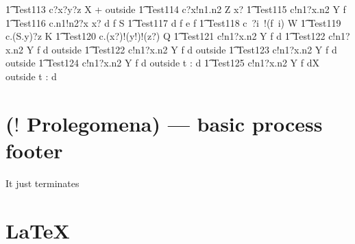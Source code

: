 \documentclass{article}
\begin{document}
%
\begin{circusaction}
   \t1 Test113 \circdef c?x?y?z \circat X \then {} + outside \rcirctime \Skip
   \also
   \t1 Test114 \circdef c?x!n1.n2 \circat Z \then \lcirctime x? \rcirctime \Skip 
   \also
   \t1 Test115 \circdef c!n1?x.n2 \circat Y \then \lcirctime f \rcirctime \Skip
   \also
   \t1 Test116 \circdef c.n1!n2?x \circat x? \then {} \rcirctime d \circat f \then \lcirctime \theta S \rcirctime \Skip 
   \also
   \t1 Test117 \circdef d \then \lcirctime f \rcirctime e \then \lcirctime f \rcirctime \Skip 
   \also
   \t1 Test118 \circdef c~?i~!(f~i) \circat W \then \Skip
       \also
   \t1 Test119 \circdef c.(S.y)?z \circat K \then \Skip
       \also
   \t1 Test120 \circdef c.(x?)!(y!)!(z?) \circat Q \then {} \rcirctime \Skip 
   \also
   \t1 Test121 \circdef c!n1?x.n2 \circat Y \then \lcirctime f \rcirctime d \then \Skip
   \also
   \t1 Test122 \circdef c!n1?x.n2 \circat Y \then \lcirctime f \rcirctime d \then \lcirctime 
   outside \rcirctime \Skip
   \also
   \t1 Test122 \circdef c!n1?x.n2 \circat Y \then \lcirctime f \rcirctime d \then \lcirctime 
   outside \rcirctime {} \rcirctime \circstartby \Skip  
   \also
   \t1 Test123 \circdef c!n1?x.n2 \circat Y \then \lcirctime f \rcirctime d \then \lcirctime 
   outside \rcirctime {} \rcirctime \circstartby {}
   \also
   \t1 Test124 \circdef c!n1?x.n2 \circat Y \then \lcirctime f \rcirctime d \then \lcirctime 
   outside \rcirctime {} \rcirctime \circstartby \circwait t : \nat \circspot d \then 
   \Skip   
   \also
   \t1 Test125 \circdef c!n1?x.n2 \circat Y \then \lcirctime f \rcirctime d\circat X \then 
   \lcirctime outside \rcirctime {} \rcirctime \circstartby \circwait t : \nat 
   \circspot d \then \Skip

\end{circusaction}    

\newpage
\section{($!$ Prolegomena) --- basic process footer}

It just terminates

\begin{circusaction}
   \circspot \Skip
\end{circusaction}

\begin{circus}
   \circend
\end{circus}

\newpage
\section{\LaTeX}
\end{document}

